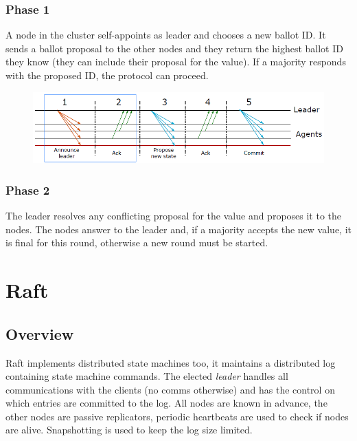 		\subsubsection{Phase 1}
		A node in the cluster self-appoints as leader and chooses a new ballot ID. It sends a ballot proposal to the other nodes and they return the highest ballot ID they know (they can include their proposal for the value). If a majority responds with the proposed ID, the protocol can proceed.
		\begin{figure}[H]
			\centering
			\includegraphics[width=0.8\linewidth]{images/paxos.png}
		\end{figure}
		\subsubsection{Phase 2}
		The leader resolves any conflicting proposal for the value and proposes it to the nodes. The nodes answer to the leader and, if a majority accepts the new value, it is final for this round, otherwise a new round must be started.

\section{Raft}
	\subsection{Overview}
	Raft implements distributed state machines too, it maintains a distributed log containing state machine commands.\newline
	The elected \textit{leader} handles all communications with the clients (no comms otherwise) and has the control on which entries are committed to the log.\newline
	All nodes are known in advance, the other nodes are passive replicators, periodic heartbeats are used to check if nodes are alive.\newline
	Snapshotting is used to keep the log size limited. 

